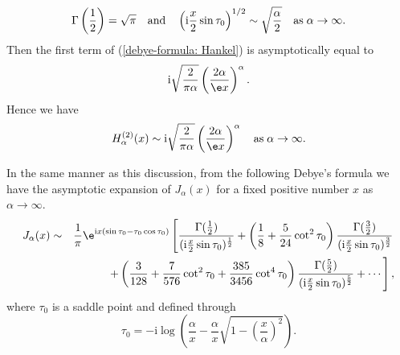 \begin{rem}
\begin{displaymath}
\Gamma\left(\frac{1}{2}\right)=\sqrt{\pi} \quad {\rm and} \quad \left(\mathrm{i}\frac{x}{2}\sin\tau_0\right)^{1/2} \sim \sqrt{\frac{\alpha}{2}}\quad {\rm as}\;\alpha\rightarrow\infty.
\end{displaymath}
Then the first term of (\ref{debye-formula: Hankel}) is asymptotically equal to
\begin{displaymath}
\mathrm{i}\sqrt{\frac{2}{\pi\alpha}}\left(\frac{2\alpha}{\e x}\right)^\alpha.
\end{displaymath}
Hence we have
\begin{displaymath}
H^{(2)}_\alpha(x) \sim \mathrm{i}\sqrt{\frac{2}{\pi\alpha}}\left(\frac{2\alpha}{\e x}\right)^\alpha \quad {\rm as}\;\alpha\rightarrow\infty.
\end{displaymath}

In the same manner as this discussion, from the following Debye's formula\cite{Debye} we have the asymptotic expansion of $J_\alpha(x)$ for a fixed positive number $x$ as $\alpha\rightarrow\infty$.
\begin{eqnarray}
J_{\alpha}(x)&\sim&\frac{\mathrm{1}}{\pi}\e^{\mathrm{i}x(\sin\tau_0-\tau_0\cos\tau_0)}\left[\frac{\Gamma(\frac{1}{2})}{(\mathrm{i}\frac{x}{2}\sin\tau_0)^{\frac{1}{2}}}+\left(\frac{1}{8}+\frac{5}{24}\cot^2\tau_0\right)\frac{\Gamma(\frac{3}{2})}{(\mathrm{i}\frac{x}{2}\sin\tau_0)^{\frac{3}{2}}}\right. \nonumber\\
&&\left.+\left(\frac{3}{128}+\frac{7}{576}\cot^2\tau_0+\frac{385}{3456}\cot^4\tau_0\right)\frac{\Gamma(\frac{5}{2})}{(\mathrm{i}\frac{x}{2}\sin\tau_0)^{\frac{5}{2}}}+\cdots\right],
\label{debye-formula: Bessel}
\end{eqnarray}
where $\tau_0$ is a saddle point and defined through
\begin{equation}
\tau_0=-\mathrm{i}\log\left(\frac{\alpha}{x}-\frac{\alpha}{x}\sqrt{1-\left(\frac{x}{\alpha}\right)^2}\right).
\label{tau_0-2}
\end{equation}
\end{rem}
